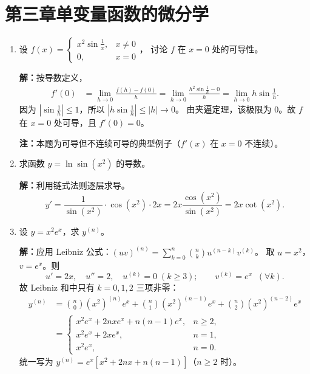 \documentclass[12pt,a4paper]{ctexart}
\begin{document}
\section*{第三章\quad 单变量函数的微分学}

\begin{enumerate}[leftmargin=*,label=\arabic*.,start=11]
  \item 设 $f(x) = \begin{cases} x^2\sin\frac{1}{x}, & x \neq 0 \\ 0, & x = 0 \end{cases}$，
    讨论 $f$ 在 $x=0$ 处的可导性。

    \textbf{解：}按导数定义，
    \begin{align*}
      f'(0) &= \lim_{h\to 0}\frac{f(h)-f(0)}{h}
             = \lim_{h\to 0}\frac{h^2\sin\frac{1}{h} - 0}{h}
             = \lim_{h\to 0} h\sin\frac{1}{h}.
    \end{align*}
    因为 $|\sin\frac{1}{h}| \le 1$，所以 $|h\sin\frac{1}{h}| \le |h| \to 0$。
    由夹逼定理，该极限为 $0$。故 $f$ 在 $x=0$ 处可导，且 $f'(0)=0$。

    \textbf{注：}本题为可导但不连续可导的典型例子（$f'(x)$ 在 $x=0$ 不连续）。

  \item 求函数 $y = \ln\sin(x^2)$ 的导数。

    \textbf{解：}利用链式法则逐层求导。
    \[
    y' = \frac{1}{\sin(x^2)} \cdot \cos(x^2) \cdot 2x
        = 2x \frac{\cos(x^2)}{\sin(x^2)}
        = 2x \cot(x^2).
    \]

  \item 设 $y = x^2 e^x$，求 $y^{(n)}$。

    \textbf{解：}应用 Leibniz 公式：$(uv)^{(n)} = \sum_{k=0}^n \binom{n}{k} u^{(n-k)}v^{(k)}$。
    取 $u = x^2$，$v = e^x$。则
    \[
    u' = 2x,\quad u'' = 2,\quad u^{(k)} = 0\;(k \ge 3); \qquad
    v^{(k)} = e^x \;\;(\forall k).
    \]
    故 Leibniz 和中只有 $k=0,1,2$ 三项非零：
    \begin{align*}
      y^{(n)} &= \binom{n}{0} (x^2)^{(n)} e^x
               + \binom{n}{1} (x^2)^{(n-1)} e^x
               + \binom{n}{2} (x^2)^{(n-2)} e^x \\
              &= \begin{cases}
                   x^2 e^x + 2nx e^x + n(n-1) e^x, & n \ge 2, \\
                   x^2 e^x + 2x e^x, & n = 1, \\
                   x^2 e^x, & n = 0.
                 \end{cases}
    \end{align*}
    统一写为 $y^{(n)} = e^x[x^2 + 2nx + n(n-1)]$（$n \ge 2$ 时）。


\end{enumerate}
\end{document}
